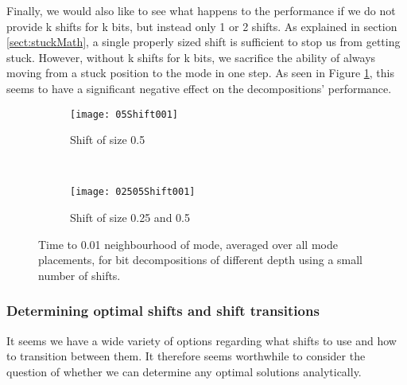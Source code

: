 Finally, we would also like to see what happens to the performance if we do not provide k shifts for k bits, but instead only 1 or 2 shifts. As explained in section \ref{sect:stuckMath}, a single properly sized shift is sufficient to stop us from getting stuck. However, without k shifts for k bits, we sacrifice the ability of always moving from a stuck position to the mode in one step. As seen in Figure \ref{fig:fewShifts}, this seems to have a significant negative effect on the decompositions' performance. 

\begin{figure}[h]
    \centering
    \begin{subfigure}[t]{0.48\textwidth}
      \texttt{[image: 05Shift001]}
      \caption{Shift of size 0.5}
    \end{subfigure}
    ~
    \begin{subfigure}[t]{0.48\textwidth}
      \texttt{[image: 02505Shift001]}
      \caption{Shift of size 0.25 and 0.5}
    \end{subfigure}
    \caption{Time to 0.01 neighbourhood of mode, averaged over all mode placements, for bit decompositions of different depth using a small number of shifts.}
    \label{fig:fewShifts}
\end{figure}

\subsubsection{Determining optimal shifts and shift transitions}
It seems we have a wide variety of options regarding what shifts to use and how to transition between them. It therefore seems worthwhile to consider the question of whether we can determine any optimal solutions analytically. 

